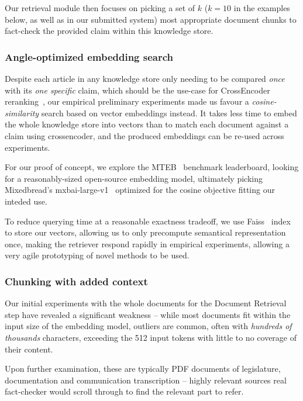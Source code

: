 Our retrieval module then focuses on picking a set of $k$ ($k=10$ in the examples below, as well as in our submitted system) most appropriate document chunks to fact-check the provided claim within this knowledge store.

\subsubsection{Angle-optimized embedding search}
\label{sec:knn}
Despite each article in any knowledge store only needing to be compared \textit{once} with its \textit{one specific} claim, which should be the use-case for CrossEncoder reranking~\cite{dejean2024thoroughcomparisoncrossencodersllms}, our empirical preliminary experiments made us favour a \textit{cosine-similarity} search based on vector embeddings instead.
It takes less time to embed the whole knowledge store into vectors than to match each document against a claim using crossencoder, and the produced embeddings can be re-used across experiments.

For our proof of concept, we explore the MTEB~\cite{muennighoff-etal-2023-mteb} benchmark leaderboard, looking for a reasonably-sized open-source embedding model, ultimately picking Mixedbread's mxbai-large-v1~\cite{li-li-2024-aoe,emb2024mxbai} optimized for the cosine objective fitting our inteded use.

To reduce querying time at a reasonable exactness tradeoff, we use Faiss~\cite{douze2024faiss,johnson2019billion} index to store our vectors, allowing us to only precompute semantical representation once, making the retriever respond rapidly in empirical experiments, allowing a very agile prototyping of novel methods to be used.

\subsubsection{Chunking with added context}
Our initial experiments with the whole \averitec{}  documents for the Document Retrieval step have revealed a significant weakness -- while most documents fit within the input size of the embedding model, outliers are common, often with \textit{hundreds of thousands} characters, exceeding the 512 input tokens with little to no coverage of their content.

Upon further examination, these are typically PDF documents of legislature, documentation and communication transcription -- highly relevant sources real fact-checker would scroll through to find the relevant part to refer. 

